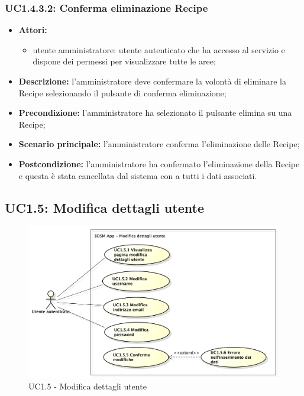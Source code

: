 \subsubsection{UC1.4.3.2: Conferma eliminazione Recipe}
\begin{itemize}
	\item \textbf{Attori:}
	\begin{itemize}
		\item utente amministratore: utente autenticato che ha accesso al servizio e dispone dei permessi per visualizzare tutte le aree;
	\end{itemize}
	\item \textbf{Descrizione:} l'amministratore deve confermare la volontà di eliminare la Recipe selezionando il pulsante di conferma eliminazione;
	\item \textbf{Precondizione:} l'amministratore ha selezionato il pulsante elimina su una Recipe;
	\item \textbf{Scenario principale:} l'amministratore conferma l'eliminazione delle Recipe;
	\item \textbf{Postcondizione:} l'amministratore ha confermato l'eliminazione della Recipe e questa è stata cancellata dal sistema con a tutti i dati associati.
\end{itemize}

\pagebreak


\subsection{UC1.5: Modifica dettagli utente}
\begin{figure}[!ht]
	\centering
	\centerline{\includegraphics[scale=0.45]{./images/UC1_5.pdf}}
	\caption{UC1.5 - Modifica dettagli utente}
\end{figure}

